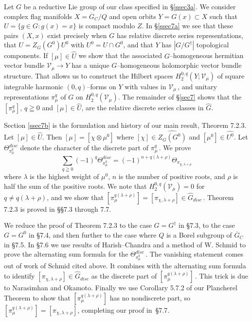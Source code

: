 \documentclass{conm-p-l}
\def\cV{\mathcal{V}}
\begin{document}
Let $G$ be a reductive Lie group of our class specified in \S \ref{ssec3a}.  
We consider complex flag manifolds $X = \overline{G}_C/Q$ and open orbits 
$Y = G(x) \subset X$ such that $U = \{g \in G : g(x) = x\}$ is compact modulo
$Z$.  In \S \ref{ssec7a}  we see that these pairs $(X,x)$ exist precisely 
when $G$ 
has relative discrete series representations, that $U = Z_G(G^0)U^0$ with
$U^0 = U \cap G^0$, and that $Y$ has $|G/G^\dagger|$ topological components.
If $[\mu] \in \widehat{U}$ we show that the associated $G$--homogeneous
hermitian vector bundle $\cV_\mu \to Y$ has a unique $G$--homogeneous
holomorphic vector bundle structure.  That allows us to construct the
Hilbert spaces $H^{0,q}_2(Y;\cV_\mu)$ of square integrable harmonic 
$(0,q)$--forms on $Y$ with  values in $\cV_\mu$\,, and unitary representations 
$\pi^q_\mu$ of $G$ on $H^{0,q}_2(\cV_\mu)$.  The remainder of \S \ref{sec7} 
shows that the 
$[\pi^q_\mu]$, $q \geqq 0$ and $[\mu] \in \widehat{U}$, are the relative 
discrete series classes in $\widehat{G}$.
\medskip

Section \ref{ssec7b} is the formulation and history of our main result, 
Theorem 7.2.3.
Let $[\mu] \in \widehat{U}$.  Then $[\mu] = [\chi \otimes \mu^0]$ where
$[\chi] \in \widehat{Z_G(G^0)}$ and $[\mu^0] \in \widehat{U^0}$.  Let
$\Theta^{disc}_{\pi^q_\mu}$ denote the character of the discrete part of
$\pi^q_\mu$\,.  We prove
$$
\sum_{q \geqq 0} (-1)^q \Theta^{disc}_{\pi^q_\mu} =
	(-1)^{n + q(\lambda + \rho)} \Theta_{\pi_{\chi, \lambda + \rho}}
$$
where $\lambda$ is the highest weight of $\mu^0$, $n$ is the number of
positive roots, and $\rho$ is half the sum of the positive roots.  We
note that $H^{0,q}_2(\cV_\mu) = 0$ for $q \ne q(\lambda + \rho)$, and
we show that $[\pi^{q(\lambda + \rho)}_\mu] = [\pi_{\chi, \lambda + \rho}]
\in \widehat{G}_{disc}$\,.  Theorem 7.2.3 is proved in \S\S 7.3 through 7.7.
\medskip

We reduce the proof of Theorem 7.2.3 to the case $G = G^\dagger$ in \S 7.3, 
to the case $G = G^0$ in \S 7.4, and then further to the case where $Q$ is
a Borel subgroup of $\overline{G}_C$ in \S 7.5.  In \S 7.6 we use results
of Harish--Chandra and a method of W. Schmid to prove the alternating sum
formula for the $\Theta^{disc}_{\pi^q_\mu}$\,.  The vanishing statement comes 
out of work of Schmid \cite{S1976} cited above.  It combines with the
alternating sum formula to identify $[\pi_{\chi, \lambda + \rho}] \in 
\widehat{G}_{disc}$ as the discrete part of $[\pi^{q(\lambda + \rho)}_\mu]$\,.
This trick is due to Narasimhan and Okamoto.  Finally we use Corollary 5.7.2
of our Plancherel Theorem to show that $[\pi^{q(\lambda + \rho)}_\mu]$ has
no nondiscrete part, so $[\pi^{q(\lambda + \rho)}_\mu] = 
[\pi_{\chi, \lambda + \rho}]$, completing our proof in~\S 7.7.
\medskip
\medskip
\end{document}
